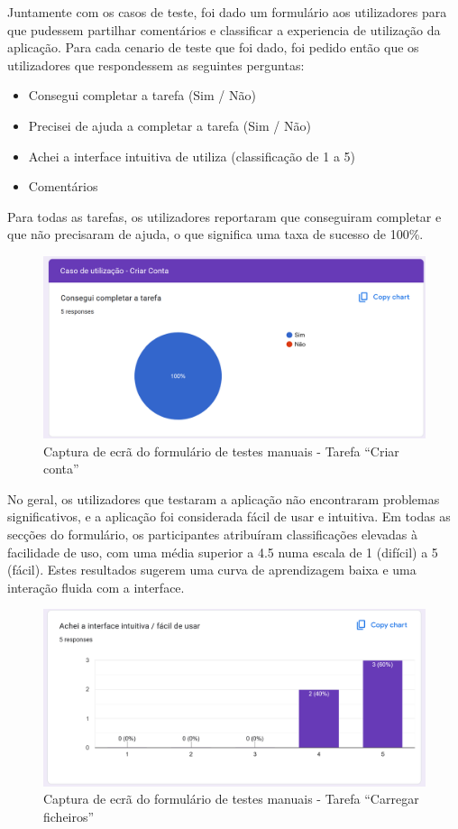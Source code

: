 Juntamente com os casos de teste, foi dado um formulário aos utilizadores para que pudessem partilhar comentários e classificar a experiencia de utilização da aplicação. Para cada cenario de teste que foi dado, foi pedido então que os utilizadores que respondessem as seguintes perguntas:

\begin{itemize}
    \item Consegui completar a tarefa (Sim / Não)
    \item Precisei de ajuda a completar a tarefa (Sim / Não)
    \item Achei a interface intuitiva de utiliza (classificação de 1 a 5)
    \item Comentários
\end{itemize}

Para todas as tarefas, os utilizadores reportaram que conseguiram completar e que não precisaram de ajuda, o que significa uma taxa de sucesso de 100\%.

\begin{figure}[H]
\centering
\includegraphics[max width=\textwidth]{./img/form1}
\caption{Captura de ecrã do formulário de testes manuais - Tarefa ``Criar conta''}
\label{fig:form1}
\end{figure}

No geral, os utilizadores que testaram a aplicação não encontraram problemas significativos, e a aplicação foi considerada fácil de usar e intuitiva. Em todas as secções do formulário, os participantes atribuíram classificações elevadas à facilidade de uso, com uma média superior a 4.5 numa escala de 1 (difícil) a 5 (fácil). Estes resultados sugerem uma curva de aprendizagem baixa e uma interação fluida com a interface.

\begin{figure}[H]
\centering
\includegraphics[max width=\textwidth]{./img/form2}
\caption{Captura de ecrã do formulário de testes manuais - Tarefa ``Carregar ficheiros''}
\label{fig:form2}
\end{figure}

